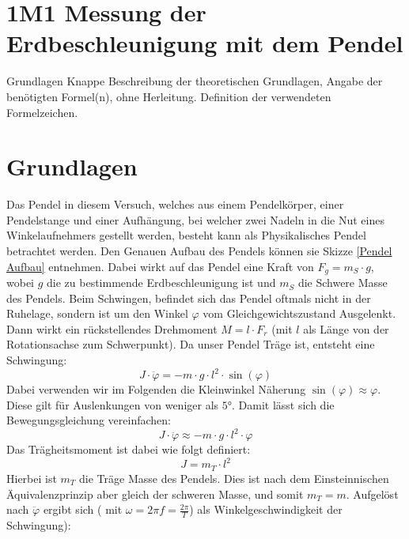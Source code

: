 \documentclass[twoside]{protokoll}
\begin{document}
 
\section{1M1 Messung der Erdbeschleunigung mit dem Pendel}
 
\begin{aufgabe}{Grundlagen}
  Knappe Beschreibung der theoretischen Grundlagen, Angabe der
  benötigten Formel(n), ohne Herleitung. Definition der verwendeten
  Formelzeichen.
\end{aufgabe}

\section{Grundlagen}

Das Pendel in diesem Versuch, welches aus einem Pendelkörper, einer Pendelstange und einer Aufhängung, bei welcher zwei Nadeln in die Nut eines Winkelaufnehmers gestellt werden, besteht kann als Physikalisches Pendel betrachtet werden.
Den Genauen Aufbau des Pendels können sie Skizze \ref{Pendel Aufbau} entnehmen.
Dabei wirkt auf das Pendel eine Kraft von $F_g = m_S \cdot g$, wobei $g$ die zu bestimmende Erdbeschleunigung ist und $m_S$ die Schwere Masse des Pendels.
Beim Schwingen, befindet sich das Pendel oftmals nicht in der Ruhelage, sondern ist um den Winkel $\varphi$ vom Gleichgewichtszustand Ausgelenkt.
Dann wirkt ein rückstellendes Drehmoment $ M = l \cdot F_r$ (mit $l$ als Länge von der Rotationsachse zum Schwerpunkt).
Da unser Pendel Träge ist, entsteht eine Schwingung: 
\begin{equation}
    J \cdot \ddot{\varphi} = -m \cdot g \cdot l^2 \cdot \sin(\varphi)
\end{equation}
Dabei verwenden wir im Folgenden die Kleinwinkel Näherung $\sin(\varphi) \approx \varphi$.
Diese gilt für Auslenkungen von weniger als $5$°. Damit lässt sich die Bewegungsgleichung vereinfachen:
\begin{equation}
    J \cdot \ddot{\varphi} \approx -m \cdot g \cdot l^2 \cdot \varphi
\end{equation}
Das Trägheitsmoment ist dabei wie folgt definiert:
\begin{equation}
    J =  m_T \cdot l^2
\end{equation}
Hierbei ist $m_T$ die Träge Masse des Pendels. Dies ist nach dem Einsteinnischen Äquivalenzprinzip aber gleich der schweren Masse, und somit $m_T = m$.
Aufgelöst nach $\ddot{\varphi}$ ergibt sich ( mit $\omega = 2 \pi f = \frac{2 \pi}{T}$) als Winkelgeschwindigkeit der Schwingung):
\end{document}
